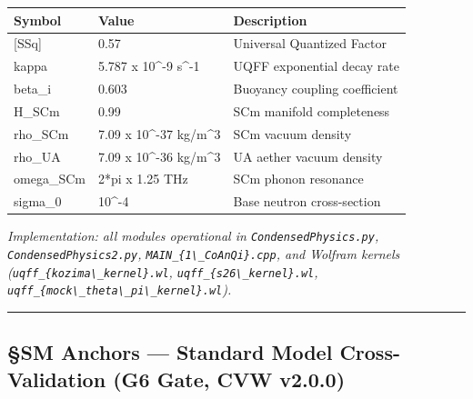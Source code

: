 \documentclass[
  11pt,
]{article}
\newcounter{none} %
\begin{document}
{\def\LTcaptype{none} %
\begin{longtable}[]{@{}lll@{}}
\toprule\noalign{}
Symbol & Value & Description \\
\midrule\noalign{}
\endhead
\bottomrule\noalign{}
\endlastfoot
{[}SSq{]} & 0.57 & Universal Quantized Factor \\
kappa & 5.787 x 10\^{}-9 s\^{}-1 & UQFF exponential decay rate \\
beta\_i & 0.603 & Buoyancy coupling coefficient \\
H\_SCm & 0.99 & SCm manifold completeness \\
rho\_SCm & 7.09 x 10\^{}-37 kg/m\^{}3 & SCm vacuum density \\
rho\_UA & 7.09 x 10\^{}-36 kg/m\^{}3 & UA aether vacuum density \\
omega\_SCm & 2*pi x 1.25 THz & SCm phonon resonance \\
sigma\_0 & 10\^{}-4 & Base neutron cross-section \\
\end{longtable}
}

\emph{Implementation: all modules operational in
\texttt{CondensedPhysics.py}, \texttt{CondensedPhysics2.py},
\texttt{MAIN\_\{1\textbackslash{}\_CoAnQi\}.cpp}, and Wolfram kernels
(\texttt{uqff\_\{kozima\textbackslash{}\_kernel\}.wl},
\texttt{uqff\_\{s26\textbackslash{}\_kernel\}.wl},
\texttt{uqff\_\{mock\textbackslash{}\_theta\textbackslash{}\_pi\textbackslash{}\_kernel\}.wl}).}

\begin{center}\rule{0.5\linewidth}{0.5pt}\end{center}

\subsection{§SM Anchors --- Standard Model Cross-Validation (G6 Gate,
CVW
v2.0.0)}\label{sm-anchors-standard-model-cross-validation-g6-gate-cvw-v2.0.0}
\end{document}
